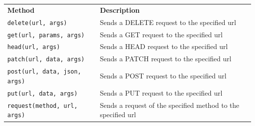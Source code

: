 \documentclass[12pt,a4paper]{article}
\newcommand{\lcode}[1]{%
	\lstinline{#1}%
}
\newcommand{\tcol}[2]{%
	\quad #1 & #2 \\
}
\begin{document}
\begin{center}
	\begin{longtable}{p{} p{}}
\tcol{\textbf{Method}}{\textbf{Description}}
\tcol{\lcode{delete(url, args)}}{Sends a DELETE request to the specified url}
\tcol{\lcode{get(url, params, args)}}{Sends a GET request to the specified url}
\tcol{\lcode{head(url, args)}}{Sends a HEAD request to the specified url}
\tcol{\lcode{patch(url, data, args)}}{Sends a PATCH request to the specified url}
\tcol{\lcode{post(url, data, json, args)}}{Sends a POST request to the specified url}
\tcol{\lcode{put(url, data, args)}}{Sends a PUT request to the specified url}
\tcol{\lcode{request(method, url, args)}}{Sends a request of the specified method to the specified url}
	\end{longtable}
\end{center}


\end{document}

